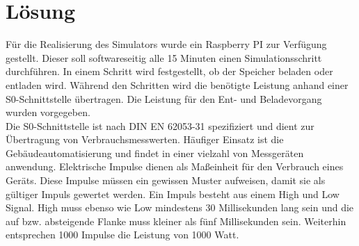 \section{Lösung}
Für die Realisierung des Simulators wurde ein Raspberry PI zur Verfügung gestellt. Dieser soll softwareseitig alle 15 Minuten einen Simulationsschritt durchführen. In einem Schritt wird festgestellt, ob der Speicher beladen oder entladen wird. Während den Schritten wird die benötigte Leistung anhand einer S0-Schnittstelle übertragen. Die Leistung für den Ent- und Beladevorgang wurden vorgegeben.\\
Die S0-Schnittstelle ist nach DIN EN 62053-31 spezifiziert und dient zur Übertragung von Verbrauchsmesswerten. Häufiger Einsatz ist die Gebäudeautomatisierung und findet in einer vielzahl von Messgeräten anwendung. Elektrische Impulse dienen als Maßeinheit für den Verbrauch eines Geräts. Diese Impulse müssen ein gewissen Muster aufweisen, damit sie als gültiger Impuls gewertet werden. Ein Impuls besteht aus einem High und Low Signal. High muss ebenso wie Low mindestens 30 Millisekunden lang sein und die auf bzw. absteigende Flanke muss kleiner als fünf Millisekunden sein. Weiterhin entsprechen 1000 Impulse die Leistung von 1000 Watt.